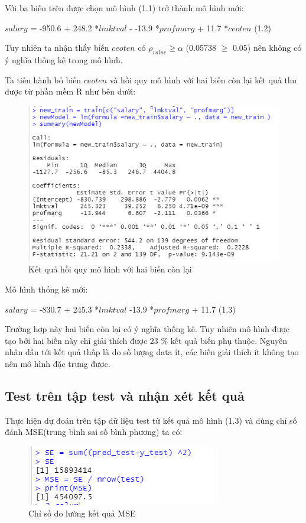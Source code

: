 Với ba biến trên được chọn mô hình (1.1) trở thành mô hình mới:

$\textit{salary}$ = -950.6 + 248.2 *$\textit{lmktval}$ - -13.9 *$\textit{profmarg}$ + 11.7  *$\textit{ceoten}$  (1.2)

Tuy nhiên ta nhận thấy biến $\textit{ceoten}$ có $\rho_{value} \ge \alpha$ (0.05738 $\ge$ 0.05) nên không có ý nghĩa thống kê trong mô hình.

Ta tiến hành bỏ biến $\textit{ceoten}$ và hồi quy mô hình với hai biến còn lại kết quả thu được từ phần mềm R như bên dưới:

\begin{figure}[h!]
	\centering
	\includegraphics[scale = 0.52]{../Photo Of Result/B1_newsummary.PNG}  
	\caption{Kết quả hồi quy mô hình với hai biến còn lại}
	\label{ex1:model:1}
\end{figure}

Mô hình thống kê mới:

$\textit{salary}$ = -830.7 + 245.3 *$\textit{lmktval}$ -13.9 *$\textit{profmarg}$ + 11.7  (1.3)


Trường hợp này hai biến còn lại có ý nghĩa thống kê. Tuy nhiên mô hình được tạo bởi hai biến này chỉ giải thích được 23 $\%$ kết quả biến phụ thuộc. Nguyên nhân dẫn tới kết quả thấp là do số lượng data ít, các biến giải thích ít không tạo nên mô hình đặc trưng được.



\subsection*{Test trên tập test và nhận xét kết quả}

Thực hiện dự đoán trên tập dữ liệu test từ kết quả mô hình (1.3)  và dùng chỉ số đánh MSE(trung bình sai số bình phương) ta có:

\begin{figure}[h!]
	\centering
	\includegraphics[scale = 0.5]{../Photo Of Result/B1_MSE.PNG}  
	\caption{Chỉ số đo lường kết quả MSE}
	\label{ex1:model:1}
\end{figure}










